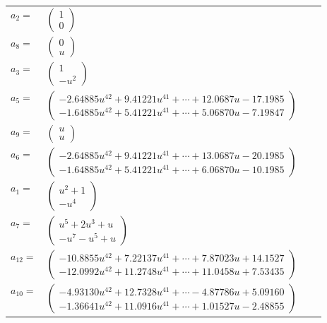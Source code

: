 \documentclass[1p]{elsarticle_modified}
\theoremstyle{definition}
\begin{document}
\begin{tabular}{m{7pt} m{180pt} m{7pt} m{180pt} }
\flushright $a_{2}=$&$\begin{pmatrix}1\\0\end{pmatrix}$ \\
\flushright $a_{8}=$&$\begin{pmatrix}0\\u\end{pmatrix}$ \\
\flushright $a_{3}=$&$\begin{pmatrix}1\\- u^2\end{pmatrix}$ \\
\flushright $a_{5}=$&$\begin{pmatrix}-2.64885 u^{42}+9.41221 u^{41}+\cdots+12.0687 u-17.1985\\-1.64885 u^{42}+5.41221 u^{41}+\cdots+5.06870 u-7.19847\end{pmatrix}$ \\
\flushright $a_{9}=$&$\begin{pmatrix}u\\u\end{pmatrix}$ \\
\flushright $a_{6}=$&$\begin{pmatrix}-2.64885 u^{42}+9.41221 u^{41}+\cdots+13.0687 u-20.1985\\-1.64885 u^{42}+5.41221 u^{41}+\cdots+6.06870 u-10.1985\end{pmatrix}$ \\
\flushright $a_{1}=$&$\begin{pmatrix}u^2+1\\- u^4\end{pmatrix}$ \\
\flushright $a_{7}=$&$\begin{pmatrix}u^5+2 u^3+u\\- u^7- u^5+u\end{pmatrix}$ \\
\flushright $a_{12}=$&$\begin{pmatrix}-10.8855 u^{42}+7.22137 u^{41}+\cdots+7.87023 u+14.1527\\-12.0992 u^{42}+11.2748 u^{41}+\cdots+11.0458 u+7.53435\end{pmatrix}$ \\
\flushright $a_{10}=$&$\begin{pmatrix}-4.93130 u^{42}+12.7328 u^{41}+\cdots-4.87786 u+5.09160\\-1.36641 u^{42}+11.0916 u^{41}+\cdots+1.01527 u-2.48855\end{pmatrix}$ \\

\end{tabular}
\end{document}
